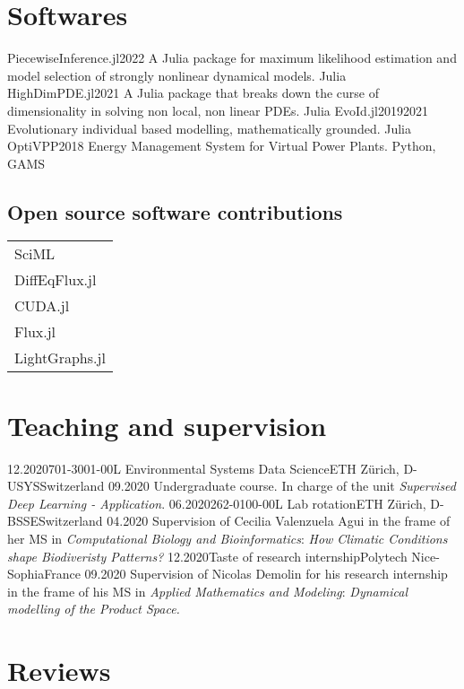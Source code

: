 \section*{Softwares}

\begin{projects}
	\project
	{PiecewiseInference.jl}{2022}
	{}
	{A Julia package for maximum likelihood estimation and model selection of strongly nonlinear dynamical models.}
	{Julia}
  \emptySeparator
	\project
	{HighDimPDE.jl}{2021}
	{ }
	{A Julia package that breaks down the curse of dimensionality in solving non local, non linear PDEs.}
	{Julia}
  \emptySeparator		
	\projectmy
	{EvoId.jl}{2019}{2021}
	{ }
	{Evolutionary individual based modelling, mathematically grounded.}
	{Julia}
  \emptySeparator
  \project
	{OptiVPP}{2018}
	{}
	{Energy Management System for Virtual Power Plants.}
	{Python, GAMS}
\end{projects}

\subsection*{Open source software contributions}
\begin{tabular}{l}
SciML\\
DiffEqFlux.jl\\ 
CUDA.jl\\ 
Flux.jl\\ 
LightGraphs.jl
\end{tabular}

\section*{Teaching and supervision}
\begin{experiences}
  \experienceshort
    {12.2020}{701-3001-00L Environmental Systems Data Science}{ETH Zürich, D-USYS}{Switzerland}
    {09.2020}
    {Undergraduate course. In charge of the unit \textit{Supervised Deep Learning - Application}.}
    \emptySeparator
  \experienceshort
    {06.2020}{262-0100-00L Lab rotation}{ETH Zürich, D-BSSE}{Switzerland}
    {04.2020}
    {Supervision of Cecilia Valenzuela Agui in the frame of her MS in \textit{Computational Biology and Bioinformatics}: \textit{How Climatic Conditions shape Biodiveristy Patterns?}}
    \emptySeparator
  \experienceshort
    {12.2020}{Taste of research internship}{Polytech Nice-Sophia}{France}
    {09.2020}
    {Supervision of Nicolas Demolin for his research internship in the frame of his MS in \textit{Applied Mathematics and Modeling}: \textit{Dynamical modelling of the Product Space.}}
\end{experiences}

\section*{Reviews}
\begin{experiences}
\end{experiences}
